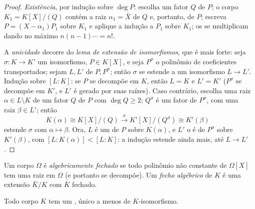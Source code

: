 \begin{proof}
\emph{Existência}, por indução sobre $\deg P$: escolha um fator
 $Q$ de $P$; o corpo $K_1 = K[X]/(Q)$ contém a raiz $\alpha_1 = \bar X$ de
$Q$ e, portanto, de $P$; escreva $P = (X -
\alpha_1)P_1$ sobre $K_1$ e aplique
a indução a $P_1$ sobre $K_1$; os  se multiplicam dando no
máximo $n(n-1)\cdots = n!$.

A \emph{unicidade} decorre do \emph{lema de extensão de isomorfismos},
que é mais forte: seja $\sigma \colon K \to K'$ um isomorfismo, $P \in K[X]$, e seja $P^\sigma$ o
polinômio de coeficientes transportados; sejam $L, L'$  de $P, P^\sigma$; então $\sigma$ se estende a um isomorfismo
$L \to L'$. Indução sobre $[L:K]$: se $P$ se decompõe em $K$,
então $L = K$ e $L' = K'$ ($P^\sigma$ se decompõe em $K'$, e $L'$ é
gerado por suas raízes). Caso contrário, escolha uma raiz $\alpha \in L \setminus K$ de um
fator  $Q$ de $P$ com $\deg Q \geq 2$; $Q^\sigma$ é um fator
 de $P^\sigma$, com uma raiz $\beta \in L'$; então
\[
K(\alpha) \cong K[X]/(Q) \xrightarrow{\ \sigma\ }
K'[X]/(Q^\sigma) \cong K'(\beta)
\]
estende $\sigma$ com $\alpha \mapsto \beta$. Ora, $L$ é um 
de $P$ sobre $K(\alpha)$, e $L'$ o é de $P^\sigma$ sobre $K'(\beta)$, com $[L : K(\alpha)] < [L:K]$: a
indução estende ainda mais, até $L \to L'$.
\end{proof}

\begin{definition}\label{def:b3:galois:closure}
Um corpo $\Omega$ é \emph{algebricamente fechado} se todo polinômio não constante de $\Omega[X]$ tem
uma raiz em $\Omega$ (e portanto se decompõe). Um \emph{fecho
algébrico} de $K$ é uma extensão 
$\bar K/K$ com $\bar K$  fechado.
\end{definition}

\begin{theorem}[Steinitz]\label{thm:b3:galois:steinitz}
Todo corpo $K$ tem um , único a menos de
$K$-isomorfismo.
\end{theorem}

